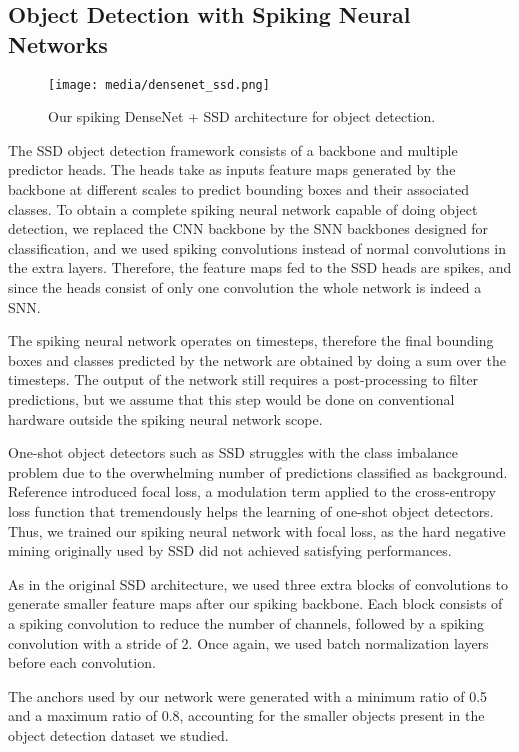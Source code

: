 \documentclass[conference]{IEEEtran}
\begin{document}
\subsection{Object Detection with Spiking Neural Networks}

\begin{figure*}[tb]
\centerline{\texttt{[image: media/densenet\_ssd.png]}}
\caption{Our spiking DenseNet + SSD architecture for object detection.}
\label{fig:od}
\end{figure*}

The SSD object detection framework \cite{ssd} consists of a backbone and multiple predictor heads. The heads take as inputs feature maps generated by the backbone at different scales to predict bounding boxes and their associated classes. To obtain a complete spiking neural network capable of doing object detection, we replaced the CNN backbone by the SNN backbones designed for classification, and we used spiking convolutions instead of normal convolutions in the extra layers. Therefore, the feature maps fed to the SSD heads are spikes, and since the heads consist of only one convolution the whole network is indeed a SNN.

The spiking neural network operates on  timesteps, therefore the final bounding boxes and classes predicted by the network are obtained by doing a sum over the  timesteps. The output of the network still requires a post-processing to filter predictions, but we assume that this step would be done on conventional hardware outside the spiking neural network scope.

One-shot object detectors such as SSD struggles with the class imbalance problem due to the overwhelming number of predictions classified as background. Reference \cite{focalloss} introduced focal loss, a modulation term applied to the cross-entropy loss function that tremendously helps the learning of one-shot object detectors. Thus, we trained our spiking neural network with focal loss, as the hard negative mining originally used by SSD did not achieved satisfying performances.

As in the original SSD architecture, we used three extra blocks of convolutions to generate smaller feature maps after our spiking backbone. Each block consists of a  spiking convolution to reduce the number of channels, followed by a  spiking convolution with a stride of 2. Once again, we used batch normalization layers before each convolution. 

The anchors used by our network were generated with a minimum ratio of 0.5 and a maximum ratio of 0.8, accounting for the smaller objects present in the object detection dataset we studied.
\end{document}
